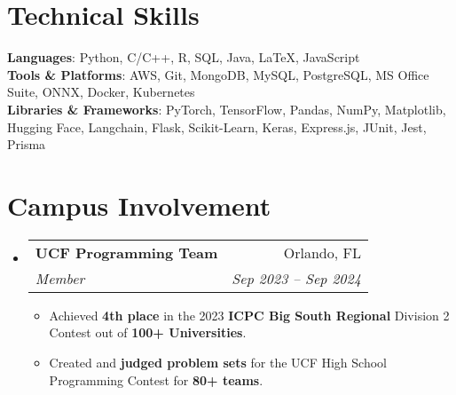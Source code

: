 \documentclass[letterpaper,11pt]{article}
\makeatletter
\newcommand{\resumeItem}[1]{
  \item\small{
    {#1 \vspace{-2pt}}
  }
}
\newcommand{\resumeSubheading}[4]{
  \vspace{-2pt}\item
    \begin{tabular*}{0.97\textwidth}[t]{l@{\extracolsep{\fill}}r}
      \textbf{#1} & #2 \\
      \textit{\small#3} & \textit{\small #4} \\
    \end{tabular*}\vspace{-7pt}
}
\newcommand{\resumeSubHeadingListStart}{\begin{itemize}[leftmargin=0.15in, label={}]}
\newcommand{\resumeSubHeadingListEnd}{\end{itemize}}
\newcommand{\resumeItemListStart}{\begin{itemize}}
\newcommand{\resumeItemListEnd}{\end{itemize}\vspace{-5pt}}
\makeatother
\begin{document}
\section{Technical Skills}
 \begin{itemize}[leftmargin=0.15in, label={}]
    \small{\item{
     \textbf{Languages}{: Python, C/C++, R, SQL, Java, LaTeX, JavaScript} \\
     \textbf{Tools \& Platforms}{: AWS, Git, MongoDB, MySQL, PostgreSQL, MS Office Suite, ONNX, Docker, Kubernetes} \\
     \textbf{Libraries \& Frameworks}{: PyTorch, TensorFlow, Pandas, NumPy, Matplotlib, Hugging Face, Langchain, Flask, Scikit-Learn, Keras, Express.js, JUnit, Jest, Prisma}
    }}
 \end{itemize}

\section{Campus Involvement}
  \resumeSubHeadingListStart
    \resumeSubheading
      {UCF Programming Team}{Orlando, FL}
      {Member}{Sep 2023 -- Sep 2024}
      \resumeItemListStart
        \resumeItem{Achieved \textbf{4th place} in the 2023 \textbf{ICPC Big South Regional} Division 2 Contest out of \textbf{100+ Universities}.}
        \resumeItem{Created and \textbf{judged problem sets} for the UCF High School Programming Contest for \textbf{80+ teams}.}
      \resumeItemListEnd
  \resumeSubHeadingListEnd
\end{document}
